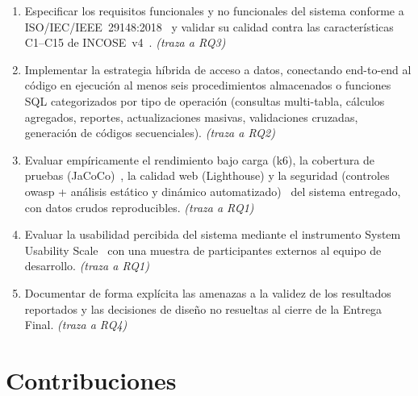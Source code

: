 \begin{enumerate}
  \item Especificar los requisitos funcionales y no funcionales del
    sistema conforme a ISO/IEC/IEEE~29148:2018~\cite{ISO29148} y validar
    su calidad contra las características C1--C15 de
    INCOSE~v4~\cite{INCOSE2023}. \emph{(traza a RQ3)}
  \item Implementar la estrategia híbrida de acceso a datos, conectando
    end-to-end al código en ejecución al menos seis procedimientos
    almacenados o funciones SQL categorizados por tipo de operación
    (consultas multi-tabla, cálculos agregados, reportes, actualizaciones
    masivas, validaciones cruzadas, generación de códigos secuenciales).
    \emph{(traza a RQ2)}
  \item Evaluar empíricamente el rendimiento bajo carga (k6), la
    cobertura de pruebas (JaCoCo)~\cite{ZHU1997,INOZEMTSEVA2014}, la
    calidad web (Lighthouse) y la seguridad (controles \gls{owasp} + análisis
    estático y dinámico automatizado)~\cite{OWASP2021,OWASPSQLI,HALFOND2005,GOULD2004}
    del sistema entregado, con datos crudos reproducibles.
    \emph{(traza a RQ1)}
  \item Evaluar la usabilidad percibida del sistema mediante el
    instrumento System Usability Scale~\cite{BROOKE1996,BANGOR2009} con
    una muestra de participantes externos al equipo de desarrollo.
    \emph{(traza a RQ1)}
  \item Documentar de forma explícita las amenazas a la validez de los
    resultados reportados y las decisiones de diseño no resueltas al
    cierre de la Entrega Final. \emph{(traza a RQ4)}
\end{enumerate}

\section{Contribuciones}

